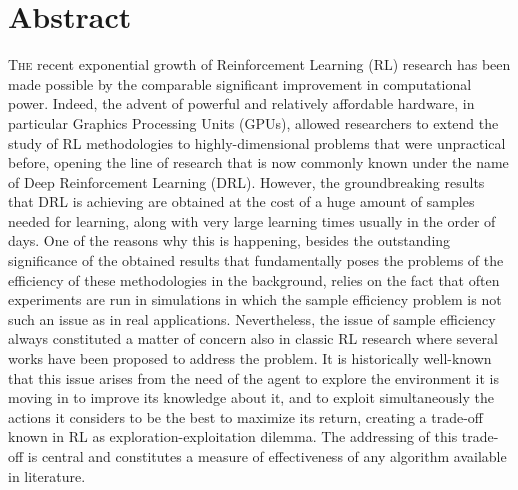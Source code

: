 \chapter*{Abstract}
\lettrine{T}{he} recent exponential growth of Reinforcement Learning (RL) research has been made possible by the comparable significant improvement in computational power. Indeed, the advent of powerful and relatively affordable hardware, in particular Graphics Processing Units (GPUs), allowed researchers to extend the study of RL methodologies to highly-dimensional problems that were unpractical before, opening the line of research that is now commonly known under the name of Deep Reinforcement Learning (DRL). However, the groundbreaking results that DRL is achieving are obtained at the cost of a huge amount of samples needed for learning, along with very large learning times usually in the order of days. One of the reasons why this is happening, besides the outstanding significance of the obtained results that fundamentally poses the problems of the efficiency of these methodologies in the background, relies on the fact that often experiments are run in simulations in which the sample efficiency problem is not such an issue as in real applications. Nevertheless, the issue of sample efficiency always constituted a matter of concern also in classic RL research where several works have been proposed to address the problem. It is historically well-known that this issue arises from the need of the agent to explore the environment it is moving in to improve its knowledge about it, and to exploit simultaneously the actions it considers to be the best to maximize its return, creating a trade-off known in RL as exploration-exploitation dilemma. The addressing of this trade-off is central and constitutes a measure of effectiveness of any algorithm available in literature. 

